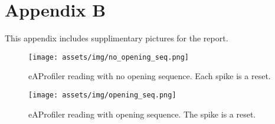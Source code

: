 \section{Appendix B}
\label{appenix:b}

This appendix includes supplimentary pictures for the report.

\begin{figure}[ht!]
    \begin{center}
    \texttt{[image: assets/img/no\_opening\_seq.png]}
    \caption{eAProfiler reading with no opening sequence. Each spike is a reset.}
    \label{fig:no_opening_seq}
    \end{center}
\end{figure}

\begin{figure}[ht!]
    \begin{center}
    \texttt{[image: assets/img/opening\_seq.png]}
    \caption{eAProfiler reading with opening sequence. The spike is a reset.}
    \label{fig:opening_seq}
    \end{center}
\end{figure}
